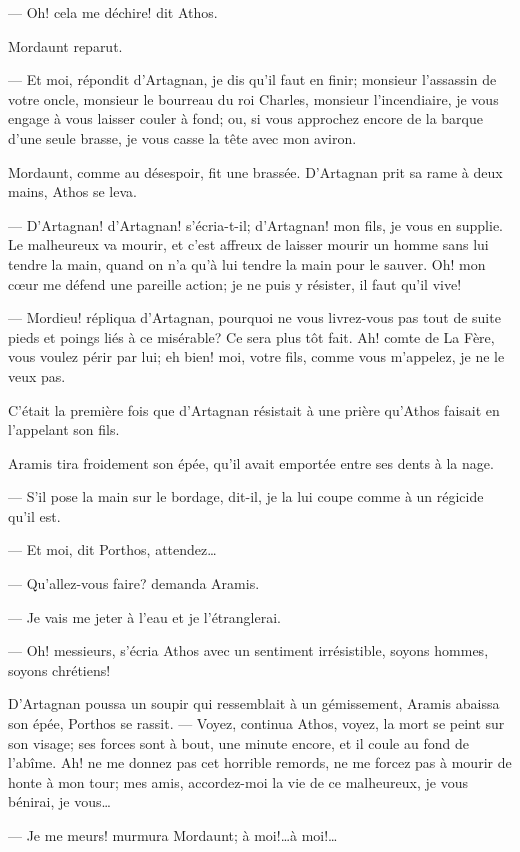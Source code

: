 — Oh! cela me déchire! dit Athos.

Mordaunt reparut.

— Et moi, répondit d'Artagnan, je dis qu'il faut en finir; monsieur l'assassin de votre oncle, monsieur le bourreau du roi Charles, monsieur l'incendiaire, je vous engage à vous laisser couler à fond; ou, si vous approchez encore de la barque d'une seule brasse, je vous casse la tête avec mon aviron.

Mordaunt, comme au désespoir, fit une brassée. D'Artagnan prit sa rame à deux mains, Athos se leva.

— D'Artagnan! d'Artagnan! s'écria-t-il; d'Artagnan! mon fils, je vous en supplie. Le malheureux va mourir, et c'est affreux de laisser mourir un homme sans lui tendre la main, quand on n'a qu'à lui tendre la main pour le sauver. Oh! mon cœur me défend une pareille action; je ne puis y résister, il faut qu'il vive!

— Mordieu! répliqua d'Artagnan, pourquoi ne vous livrez-vous pas tout de suite pieds et poings liés à ce misérable? Ce sera plus tôt fait. Ah! comte de La Fère, vous voulez périr par lui; eh bien! moi, votre fils, comme vous m'appelez, je ne le veux pas.

C'était la première fois que d'Artagnan résistait à une prière qu'Athos faisait en l'appelant son fils.

Aramis tira froidement son épée, qu'il avait emportée entre ses dents à la nage.

— S'il pose la main sur le bordage, dit-il, je la lui coupe comme à un régicide qu'il est.

— Et moi, dit Porthos, attendez\dots

— Qu'allez-vous faire? demanda Aramis.

— Je vais me jeter à l'eau et je l'étranglerai.

— Oh! messieurs, s'écria Athos avec un sentiment irrésistible, soyons hommes, soyons chrétiens!

D'Artagnan poussa un soupir qui ressemblait à un gémissement, Aramis abaissa son épée, Porthos se rassit.
— Voyez, continua Athos, voyez, la mort se peint sur son visage; ses forces sont à bout, une minute encore, et il coule au fond de l'abîme. Ah! ne me donnez pas cet horrible remords, ne me forcez pas à mourir de honte à mon tour; mes amis, accordez-moi la vie de ce malheureux, je vous bénirai, je vous\dots

— Je me meurs! murmura Mordaunt; à moi!\dots à moi!\dots

